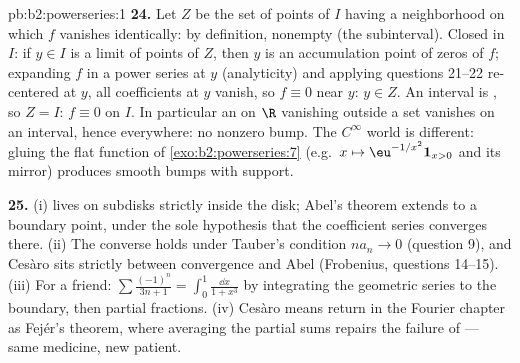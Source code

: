 \begin{solution}{pb:b2:powerseries:1}
\textbf{24.} Let $Z$ be the set of points of $I$ having a
neighborhood on which $f$ vanishes identically:  by
definition, nonempty (the subinterval). Closed in $I$: if $y
\in I$ is a limit of points of $Z$, then $y$ is an accumulation
point of zeros of $f$; expanding $f$ in a power series at $y$
(analyticity) and applying questions 21--22 re-centered at $y$,
all coefficients at $y$ vanish, so $f \equiv 0$ near $y$: $y
\in Z$. An interval is , so $Z = I$: $f \equiv 0$ on
$I$. In particular an  on $\R$ vanishing
outside a  set vanishes on an interval, hence
everywhere: no nonzero  bump. The $C^\infty$ world is
different: gluing the flat function of
\cref{exo:b2:powerseries:7} (e.g.\ $x \mapsto
\eu^{-1/x^2}\mathbf 1_{x>0}$ and its mirror) produces smooth
bumps with  support.

\textbf{25.} (i)  lives on  subdisks
strictly inside the disk; Abel's theorem extends  to
a boundary point, under the sole hypothesis that the
coefficient series converges there. (ii) The converse holds
under Tauber's condition $na_n \to 0$ (question 9), and
Ces\`aro  sits strictly between convergence and
Abel  (Frobenius, questions 14--15). (iii) For a
friend: $\sum\frac{(-1)^n}{3n+1} = \int_0^1\frac{\dd x}{1+x^3}$
by integrating the geometric series to the boundary, then
partial fractions. (iv) Ces\`aro means return in the Fourier
chapter as Fej\'er's theorem, where averaging the partial sums
repairs the failure of  --- same medicine,
new patient.
\end{solution}
